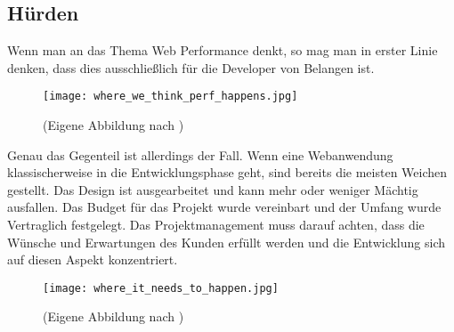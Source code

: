 	\subsection{Hürden} %
	\label{sub:hürden}
	
	Wenn man an das Thema Web Performance denkt, so mag man in erster Linie denken, dass dies ausschließlich für die Developer von Belangen ist.
	
	\begin{figure}[htbp]
		\begin{center}
			\texttt{[image: where\_we\_think\_perf\_happens.jpg]}
			\caption{(Eigene Abbildung nach \autocite[p. 10]{kovalcin15})}
			\label{fig:where_we_think_perf_happens}
		\end{center}
	\end{figure}

	Genau das Gegenteil ist allerdings der Fall. Wenn eine Webanwendung klassischerweise in die Entwicklungsphase geht, sind bereits die meisten Weichen gestellt. Das Design ist ausgearbeitet und kann mehr oder weniger Mächtig ausfallen. Das Budget für das Projekt wurde vereinbart und der Umfang wurde Vertraglich festgelegt. Das Projektmanagement muss darauf achten, dass die Wünsche und Erwartungen des Kunden erfüllt werden und die Entwicklung sich auf diesen Aspekt konzentriert.

	\begin{figure}[htbp]
		\begin{center}
			\texttt{[image: where\_it\_needs\_to\_happen.jpg]}
			\caption{(Eigene Abbildung nach \autocite[p. 11]{kovalcin15})}
			\label{fig:where_it_needs_to_happen}
		\end{center}
	\end{figure}

